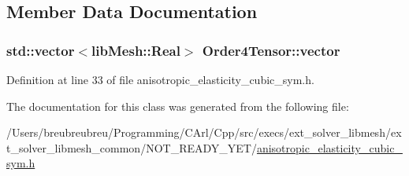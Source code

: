 \subsection{Member Data Documentation}
\hypertarget{class_order4_tensor_acec0c420962426e3104218af2ad02b4d}{}
\subsubsection[{vector}]{\setlength{\rightskip}{0pt plus 5cm}std\+::vector$<$lib\+Mesh\+::\+Real$>$ Order4\+Tensor\+::vector}\label{class_order4_tensor_acec0c420962426e3104218af2ad02b4d}


Definition at line 33 of file anisotropic\+\_\+elasticity\+\_\+cubic\+\_\+sym.\+h.



The documentation for this class was generated from the following file\+:\begin{DoxyCompactItemize}
\item 
/\+Users/breubreubreu/\+Programming/\+C\+Arl/\+Cpp/src/execs/ext\+\_\+solver\+\_\+libmesh/ext\+\_\+solver\+\_\+libmesh\+\_\+common/\+N\+O\+T\+\_\+\+R\+E\+A\+D\+Y\+\_\+\+Y\+E\+T/\hyperlink{anisotropic__elasticity__cubic__sym_8h}{anisotropic\+\_\+elasticity\+\_\+cubic\+\_\+sym.\+h}\end{DoxyCompactItemize}
